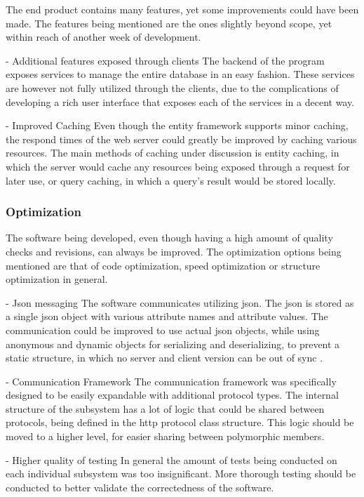 The end product contains many features, yet some improvements could have been made.
The features being mentioned are the ones slightly beyond scope, yet within reach of another week of development.

- Additional features exposed through clients
The backend of the program exposes services to manage the entire database in an easy fashion. These services are however not fully utilized through the clients, due to the complications of developing a rich user interface that exposes each of the services in a decent way.

- Improved Caching
Even though the entity framework supports minor caching, the respond times of the web server could greatly be improved by caching various resources.
The main methods of caching under discussion is entity caching, in which the server would cache any resources being exposed through a request for later use, or query caching, in which a query's result would be stored locally.

\subsubsection{Optimization}

The software being developed, even though having a high amount of quality checks and revisions, can always be improved.
The optimization options being mentioned are that of code optimization, speed optimization or structure optimization in general.

- Json messaging
The software communicates utilizing json. The json is stored as a single json object with various attribute names and attribute values.
The communication could be improved to use actual json objects, while using anonymous and dynamic objects for serializing and deserializing, to prevent a static structure, in which no server and client version can be out of sync .

- Communication Framework
The communication framework was specifically designed to be easily expandable with additional protocol types. The internal structure of the subsystem has a lot of logic that could be shared between protocols, being defined in the http protocol class structure. This logic should be moved to a higher level, for easier sharing between polymorphic members.

- Higher quality of testing
In general the amount of tests being conducted on each individual subsystem was too insignificant. More thorough testing should be conducted to better validate the correctedness of the software.
